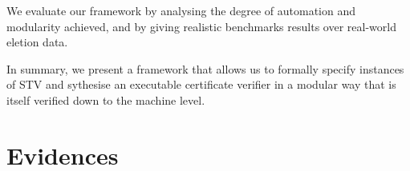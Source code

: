 \documentclass[10pt,conference]{IEEEtran}
\begin{document}

We evaluate our framework by analysing the degree of automation and
modularity achieved, and by giving realistic benchmarks results over
real-world eletion data.

In summary, we present a framework that allows us to formally
specify instances of STV and sythesise an executable
certificate verifier in a modular way that is itself verified down
to the machine level.

\section{Evidences}
\label{sec:DataEv}
\end{document}
